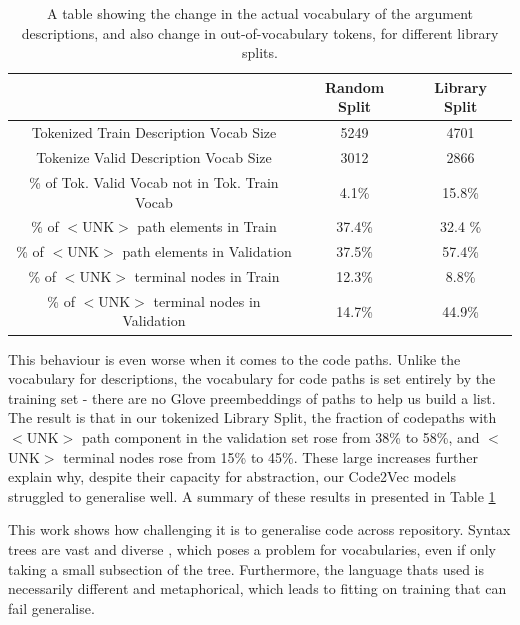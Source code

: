 \begin{table}
    \begin{center}
        \begin{tabular}{c c c}
           \hline
            & Random Split & Library Split \\
            \hline
            Tokenized Train Description Vocab Size    & 5249  &  4701 \\
            Tokenize Valid Description Vocab Size    & 3012  &  2866 \\
            \% of Tok. Valid Vocab not in Tok. Train Vocab                & 4.1\% &  15.8\% \\
            \hline
            \% of $<$UNK$>$ path elements in Train          &  37.4\%  &  32.4 \%   \\
            \% of $<$UNK$>$ path elements in Validation     &  37.5\%  &  57.4\% \\
            \% of $<$UNK$>$ terminal nodes in Train         &  12.3\%  &  8.8\%  \\ 
            \% of $<$UNK$>$ terminal nodes in Validation    &  14.7\% &  44.9\% \\   
            \hline
        \end{tabular}
    \end{center}
    \caption{A table showing the change in the actual vocabulary of the argument descriptions, and also change in out-of-vocabulary tokens, for different library splits.}
    \label{tab:vocabsplit}
\end{table}



This behaviour is even worse when it comes to the code paths.
Unlike the vocabulary for descriptions, the  vocabulary for code paths is set entirely by the training set - there are no Glove preembeddings of paths to help us build a list. The result is that in our tokenized Library Split, the fraction of codepaths with $<$UNK$>$ path component in the validation set rose from 38\% to 58\%, and $<$UNK$>$ terminal nodes rose from 15\% to 45\%. 
These large increases further explain why, despite their capacity for abstraction, our Code2Vec models struggled to generalise well. A summary of these results in presented in Table \ref{tab:vocabsplit}

This work shows how challenging it is to generalise code across repository. Syntax trees are vast and diverse \cite{allamanis_survey_2017}, which poses a problem for vocabularies, even if only taking a small subsection of the tree. 
Furthermore, the language thats used is necessarily different and metaphorical, which leads to fitting on training that can fail generalise.

